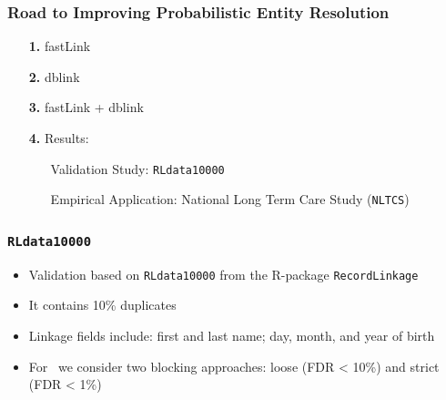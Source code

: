 \documentclass[9pt]{beamer}
\begin{document}

\begin{frame}[plain]
\frametitle{Road to Improving Probabilistic Entity Resolution}

\begin{itemize}
\item[{\color{orange!30} \bf 1.}] {\color{black!30} fastLink}
\vfill
\item[{\color{orange!30} \bf 2.}] {\color{black!30} dblink}
\vfill
\item[{\color{orange!30} \bf 3.}] {\color{black!30} fastLink + dblink }
\vfill
\item[{\color{orange} \bf 4.}] {\color{black} Results: }
\vfill
\begin{itemize}
\item[\TedB] {\color{black} Validation Study: \texttt{RLdata10000} } \vfill
\item[\TedBB] {\color{black!30} Empirical Application: National Long Term Care Study (\texttt{NLTCS})}
\end{itemize}
\vfill
\end{itemize}
\end{frame}

\addtocounter{framenumber}{-1}


\begin{frame}
\frametitle{\texttt{RLdata10000}}
 
\begin{itemize}
\item Validation based on \texttt{RLdata10000} from the R-package \texttt{RecordLinkage}
\vfill
\item It contains 10\% duplicates
\vfill
\item Linkage fields include: first and last name; day, month, and year of birth
\vfill
\item For \fLdb\ we consider two blocking approaches: loose (FDR < 10\%) and strict  (FDR < 1\%)
\vfill
\end{itemize}
 
\end{frame}
\end{document}
